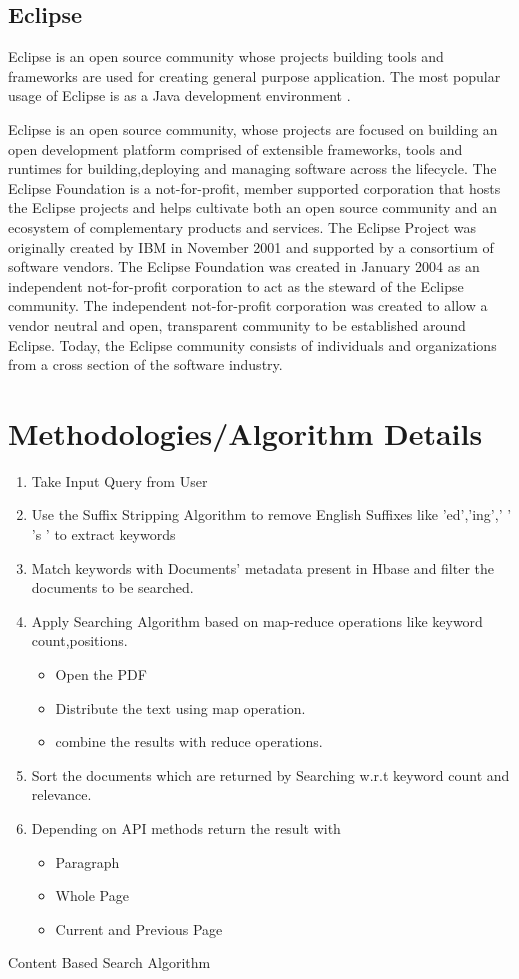 \documentclass[oneside,a4paper,12pt]{report}
\begin{document}
{ 
 \subsection{Eclipse}
 Eclipse is an open source community whose projects building tools and frameworks are used for creating general purpose application. The most popular usage of Eclipse is as a Java development environment .
 
 Eclipse is an open source community, whose projects are focused on building an open development platform comprised of extensible frameworks, tools and runtimes for building,deploying and managing software across the lifecycle. The Eclipse Foundation is a not-for-profit, member supported corporation that hosts the Eclipse projects  and helps cultivate both an open source community and an ecosystem of complementary products and services.
 The Eclipse Project was originally created by IBM in November 2001 and supported by a consortium of software vendors. The Eclipse Foundation was created in January 2004 as an independent not-for-profit corporation to act as the steward of the Eclipse community. The independent not-for-profit corporation was created to allow a vendor neutral and open, transparent community to be established around Eclipse. Today, the Eclipse community consists of individuals and organizations from a cross section of the software industry.

\section{Methodologies/Algorithm Details}

\begin{algorithm}[H]
\begin{enumerate}
\item Take Input Query from User
\item Use the Suffix Stripping Algorithm to remove English Suffixes like 'ed','ing',' ' 's ' to extract keywords
\item Match keywords with Documents' metadata present in Hbase and filter the documents to be searched.
\item Apply Searching Algorithm based on map-reduce operations like keyword count,positions.
\begin{itemize}
\item Open the PDF
\item Distribute the text using map operation.
\item combine the results with reduce operations.
\end{itemize} 
\item Sort the documents which are returned by Searching w.r.t keyword count and relevance.
\item Depending on API methods return the result with 
\begin{itemize}
\item Paragraph
\item Whole Page
\item Current and Previous Page
\end{itemize}
\end{enumerate}
\caption{Content Based Search Algorithm}
\end{algorithm}

}
\end{document}
